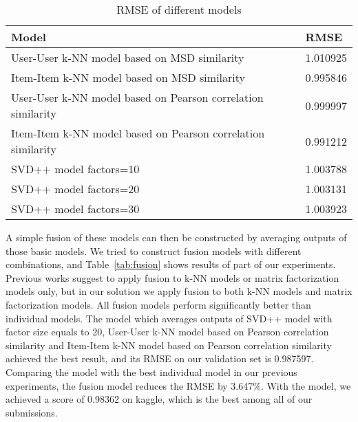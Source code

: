 \documentclass[10pt,conference,compsocconf]{IEEEtran}
\newcommand{\rtab}[1]{Table~\ref{tab:#1}}
\begin{document}
\begin{table}
\renewcommand{\arraystretch}{1.3}
\begin{tabular}{|l|l|}
\hline
\textbf{Model}                                                   & \textbf{RMSE} \\ \hline
User-User k-NN model based on MSD similarity                     & 1.010925     \\ \hline
Item-Item k-NN model based on MSD similarity                     & 0.995846     \\ \hline
User-User k-NN model based on Pearson correlation similarity     & 0.999997     \\ \hline
Item-Item k-NN model based on Pearson correlation similarity     & 0.991212     \\ \hline
SVD++ model factors=10                                           & 1.003788     \\ \hline
SVD++ model factors=20                                           & 1.003131     \\ \hline
SVD++ model factors=30                                           & 1.003923     \\ \hline
\end{tabular}
\caption{RMSE of different models}
\label{tab:models}
\end{table}

A simple fusion of these models can then be constructed by averaging outputs of those basic models. We tried to construct fusion models with different combinations, and \rtab{fusion} shows results of part of our experiments. Previous works suggest to apply fusion to k-NN models or matrix factorization models only\cite{ariel}, but in our solution we apply fusion to both k-NN models and matrix factorization models. All fusion models perform significantly better than individual models. The model which averages outputs of SVD++ model with factor size equals to 20, User-User k-NN model based on Pearson correlation similarity and Item-Item k-NN model based on Pearson correlation similarity achieved the best result, and its RMSE on our validation set is 0.987597. Comparing the model with the best individual model in our previous experiments, the fusion model reduces the RMSE by 3.647\%. With the model, we achieved a score of 0.98362 on kaggle, which is the best among all of our submissions.
\end{document}
